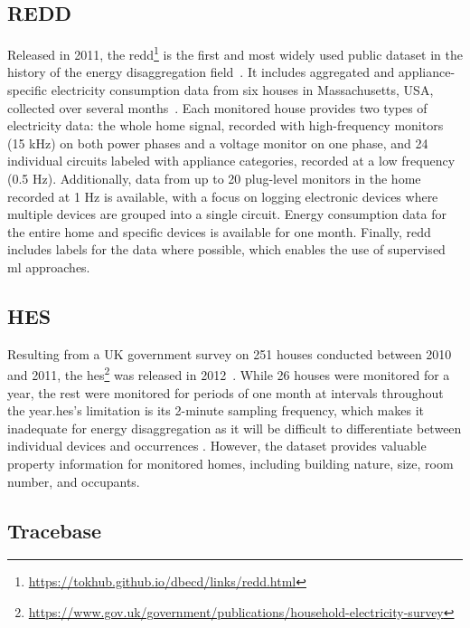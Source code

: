 \subsection{REDD}

Released in 2011, the \acrlong{redd}\footnote{\url{https://tokhub.github.io/dbecd/links/redd.html}} is the first and most widely used public dataset in the history of the energy disaggregation field~\parencite{iqbalCriticalReviewStateoftheart2021}. It includes aggregated and appliance-specific electricity consumption data from six houses in Massachusetts, USA, collected over several months~\parencite{kolterREDDPublicData2011}. Each monitored house provides two types of electricity data: the whole home signal, recorded with high-frequency monitors (15 kHz) on both power phases and a voltage monitor on one phase, and 24 individual circuits labeled with appliance categories, recorded at a low frequency (0.5 Hz). Additionally, data from up to 20 plug-level monitors in the home recorded at 1 Hz is available, with a focus on logging electronic devices where multiple devices are grouped into a single circuit. Energy consumption data for the entire home and specific devices is available for one month. Finally, \acrshort{redd} includes labels for the data where possible, which enables the use of supervised \acrshort{ml} approaches.

\subsection{HES}

Resulting from a UK government survey on 251 houses conducted between 2010 and 2011, the \acrlong{hes}\footnote{\url{https://www.gov.uk/government/publications/household-electricity-survey}} was released in 2012~\parencite{zimmermannHouseholdElectricitySurvey2012}. While 26 houses were monitored for a year, the rest were monitored for periods of one month at intervals throughout the year.\@ \acrshort{hes}'s limitation is its 2-minute sampling frequency, which makes it inadequate for energy disaggregation as it will be difficult to differentiate between individual devices and occurrences \parencite{himeurBuildingPowerConsumption2020}. However, the dataset provides valuable property information for monitored homes, including building nature, size, room number, and occupants.

\subsection{Tracebase}

